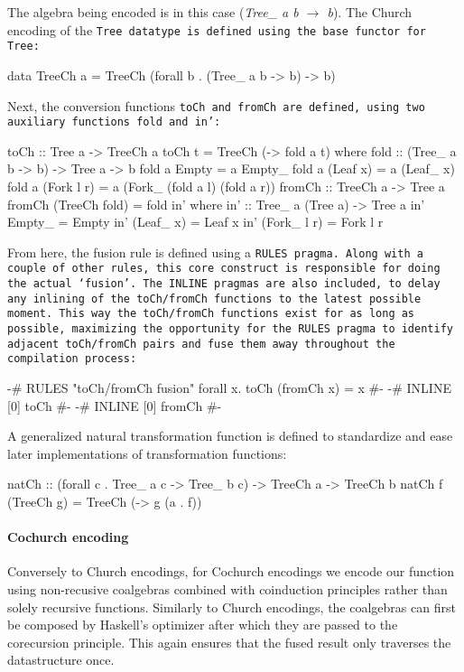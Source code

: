 The algebra being encoded is in this case (\textit{Tree\_ a b $\to$ b}).
The Church encoding of the \tt{Tree} datatype is defined using the base functor for \tt{Tree}:
\begin{code}
data TreeCh a = TreeCh (forall b . (Tree_ a b -> b) -> b)
\end{code}
Next, the conversion functions \tt{toCh} and \tt{fromCh} are defined, using two auxiliary functions \tt{fold} and \tt{in'}:
\begin{code}
toCh :: Tree a -> TreeCh a
toCh t = TreeCh (\a -> fold a t)
  where fold :: (Tree_ a b -> b) -> Tree a -> b
        fold a Empty      = a Empty_
        fold a (Leaf x)   = a (Leaf_ x)
        fold a (Fork l r) = a (Fork_ (fold a l)
                             (fold a r))
fromCh :: TreeCh a -> Tree a
fromCh (TreeCh fold) = fold in'
  where in' :: Tree_ a (Tree a) -> Tree a
        in' Empty_ = Empty
        in' (Leaf_ x) = Leaf x
        in' (Fork_ l r) = Fork l r
\end{code}
From here, the fusion rule is defined using a \tt{RULES} pragma. Along with a couple of other rules, this core construct is responsible for doing the actual `fusion'.
The \tt{INLINE} pragmas are also included, to delay any inlining of the \tt{toCh/fromCh} functions to the latest possible moment.
This way the \tt{toCh/fromCh} functions exist for as long as possible, maximizing the opportunity for the \tt{RULES} pragma to identify adjacent \tt{toCh/fromCh} pairs and fuse them away throughout the compilation process:
\begin{code}
{-# RULES "toCh/fromCh fusion" forall x. toCh (fromCh x) = x #-}
{-# INLINE [0] toCh #-}
{-# INLINE [0] fromCh #-}
\end{code}
A generalized natural transformation function is defined to standardize and ease later implementations of transformation functions:
\begin{code}
natCh :: (forall c . Tree_ a c -> Tree_ b c) -> TreeCh a -> TreeCh b
natCh f (TreeCh g) = TreeCh (\a -> g (a . f))
\end{code}
\paragraph{Cochurch encoding} Conversely to Church encodings, for Cochurch encodings we encode our function using non-recusive coalgebras combined with coinduction principles rather than solely recursive functions.
Similarly to Church encodings, the coalgebras can first be composed by Haskell's optimizer after which they are passed to the corecursion principle.
This again ensures that the fused result only traverses the datastructure once.

